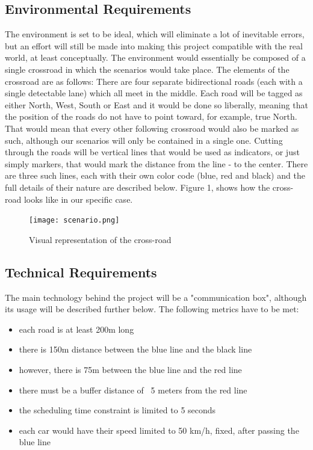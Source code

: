 \documentclass[conference]{IEEEtran}
\begin{document}
\subsection {Environmental Requirements}
The environment is set to be ideal, which will eliminate a lot of inevitable errors, but an effort will still be made into making this project compatible with the real world, at least conceptually. The environment would essentially be composed of a single crossroad in which the scenarios would take place. The elements of the crossroad are as follows: There are four separate bidirectional roads (each with a single detectable lane) which all meet in the middle. Each road will be tagged as  either North, West, South or East and it would be done so liberally, meaning that the position of the roads do not have to point toward, for example, true North. That would mean that every other following crossroad would also be marked as such, although our scenarios will only be contained in a single one. Cutting through the roads will be vertical lines that would be used as indicators, or just simply markers, that would mark the distance from the line - to the center. There are three such lines, each with their own color code (blue, red and black) and the full details of their nature are described below. Figure 1, shows how the cross-road looks like in our specific case.
\begin{figure}[h!]
	\centerline{\texttt{[image: scenario.png]}}
	\caption{Visual representation of the cross-road}
\end{figure}
\subsection{Technical Requirements}
The main technology behind the project will be a "communication box", although its usage will be described further below. The following metrics have to be met:
\begin{itemize}
	\item each road is at least 200m long
	\item there is 150m distance between the blue line and the black line
	\item however, there is 75m between the blue line and the red line
	\item there must be a buffer distance of ~5 meters from the red line
	\item the scheduling time constraint is limited to 5 seconds
	\item each car would have their speed limited to 50 km/h, fixed, after passing the blue line
\end{itemize} 
\end{document}
